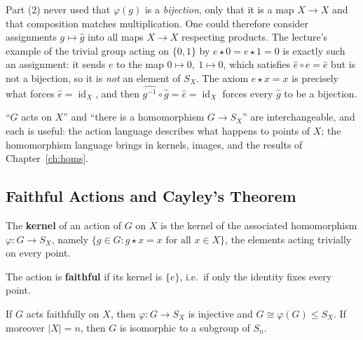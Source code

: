 \documentclass[11pt]{report}
\begin{document}
\begin{rembox}\label{rem:why-identity-axiom-what-lands-varphi-sx}
Part (2) never used that $\varphi(g)$ is a \emph{bijection}, only that it is a map $X \to X$ and that composition matches multiplication. One could therefore consider assignments $g \mapsto \hat g$ into all maps $X \to X$ respecting products. The lecture's example of the trivial group acting on $\{0, 1\}$ by $e \star 0 = e \star 1 = 0$ is exactly such an assignment: it sends $e$ to the map $0 \mapsto 0,\ 1 \mapsto 0$, which satisfies $\hat e \circ \hat e = \hat e$ but is not a bijection, so it is \emph{not} an element of $S_X$. The axiom $e \star x = x$ is precisely what forces $\hat e = \operatorname{id}_X$, and then $\widehat{g^{-1}} \circ \hat g = \hat e = \operatorname{id}_X$ forces every $\hat g$ to be a bijection.
\end{rembox}

\begin{rembox}\label{rem:two-languages-one-thing}
``$G$ acts on $X$'' and ``there is a homomorphism $G \to S_X$'' are interchangeable, and each is useful: the action language describes what happens to points of $X$; the homomorphism language brings in kernels, images, and the results of Chapter~\ref{ch:homs}.
\end{rembox}

\subsection{Faithful Actions and Cayley's Theorem}

\begin{defbox}\label{def:kernel-action-faithful-action}
The \textbf{kernel} of an action of $G$ on $X$ is the kernel of the associated homomorphism $\varphi: G \to S_X$, namely $\{g \in G : g \star x = x \text{ for all } x \in X\}$, the elements acting trivially on every point.
\end{defbox}

\begin{defbox}\label{def:faithful-action}
The action is \textbf{faithful} if its kernel is $\{e\}$, i.e.\ if only the identity fixes every point.
\end{defbox}

\begin{propbox}\label{prop:faithful-actions-embed-g-sx}
If $G$ acts faithfully on $X$, then $\varphi: G \to S_X$ is injective and $G \cong \varphi(G) \leq S_X$. If moreover $|X| = n$, then $G$ is isomorphic to a subgroup of $S_n$.
\end{propbox}
\end{document}
